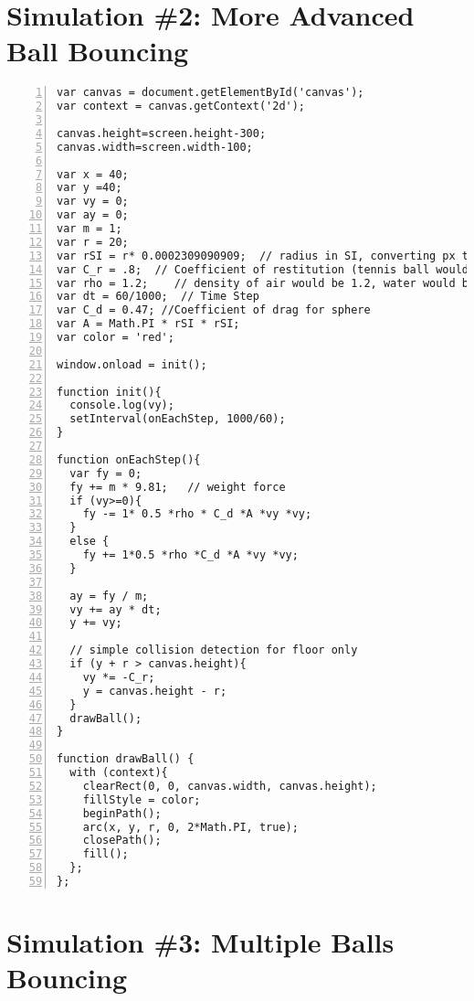 \section{Simulation \#2: More Advanced Ball Bouncing}

\begin{lstlisting}[breaklines=true, frame=single, numbers=left, caption=More Advanced Ball Bouncing Simulation, label=lst:ballbounce2]
var canvas = document.getElementById('canvas');
var context = canvas.getContext('2d');

canvas.height=screen.height-300;
canvas.width=screen.width-100;

var x = 40;
var y =40;
var vy = 0;
var ay = 0;
var m = 1;
var r = 20;
var rSI = r* 0.0002309090909;  // radius in SI, converting px to m
var C_r = .8;  // Coefficient of restitution (tennis ball would be .8)
var rho = 1.2;    // density of air would be 1.2, water would be 1000
var dt = 60/1000;  // Time Step
var C_d = 0.47; //Coefficient of drag for sphere
var A = Math.PI * rSI * rSI;
var color = 'red';

window.onload = init();
  
function init(){
  console.log(vy);
  setInterval(onEachStep, 1000/60);
}

function onEachStep(){ 
  var fy = 0;
  fy += m * 9.81;   // weight force
  if (vy>=0){
    fy -= 1* 0.5 *rho * C_d *A *vy *vy; 
  } 
  else {
    fy += 1*0.5 *rho *C_d *A *vy *vy;
  }

  ay = fy / m;
  vy += ay * dt;
  y += vy;
  
  // simple collision detection for floor only
  if (y + r > canvas.height){ 
    vy *= -C_r; 
    y = canvas.height - r;  
  }
  drawBall();
}

function drawBall() {
  with (context){
    clearRect(0, 0, canvas.width, canvas.height); 
    fillStyle = color;
    beginPath();
    arc(x, y, r, 0, 2*Math.PI, true);
    closePath();
    fill();
  };
};
\end{lstlisting}

\section{Simulation \#3: Multiple Balls Bouncing}

